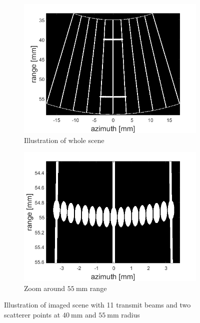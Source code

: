 \begin{figure}[ht]
    \centering
    \begin{subfigure}[t]{0.48\linewidth}
        \includegraphics[width=\linewidth]{./images/results/1/illustration_scene.png}
    \caption{Illustration of whole scene}
    \label{fig:image_illustration}
    \end{subfigure}
    \quad
    \begin{subfigure}[t]{0.48\linewidth}
        \includegraphics[width=\linewidth]{./images/results/1/zoom_55mm.png}
    \caption{Zoom around $55~$mm range}
    \label{fig:image_illustration_zoom}
    \end{subfigure}
	\caption{Illustration of imaged scene with 11 transmit beams and two scatterer points at $40~$mm and $55~$mm radius}
	\label{fig:frames_illustration}
\end{figure}

